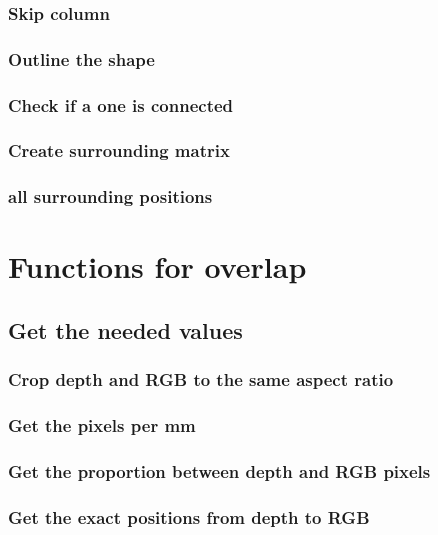 \documentclass[10pt]{article}
\begin{document}
\subsubsection{Skip column}

\subsubsection{Outline the shape}

\subsubsection{Check if a one is connected}

\subsubsection{Create surrounding matrix}

\subsubsection{all surrounding positions}


\section{Functions for overlap}
\subsection{Get the needed values}
\subsubsection{Crop depth and RGB to the same aspect ratio}

\subsubsection{Get the pixels per mm}

\subsubsection{Get the proportion between depth and RGB pixels}

\subsubsection{Get the exact positions from depth to RGB}

\end{document}
